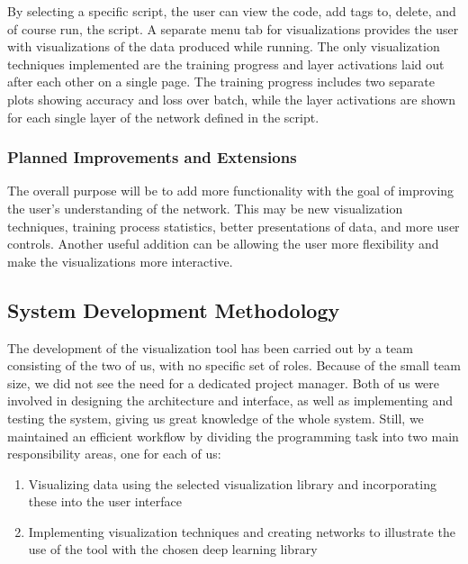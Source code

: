 \noindent By selecting a specific script, the user can view the code, add tags to, delete, and of course run, the script. A separate menu tab for visualizations provides the user with visualizations of the data produced while running. The only visualization techniques implemented are the training progress and layer activations laid out after each other on a single page. The training progress includes two separate plots showing accuracy and loss over batch, while the layer activations are shown for each single layer of the network defined in the script.

\subsubsection{Planned Improvements and Extensions}

The overall purpose will be to add more functionality with the goal of improving the user's understanding of the network. This may be new visualization techniques, training process statistics, better presentations of data, and more user controls. Another useful addition can be allowing the user more flexibility and make the visualizations more interactive.

\subsection{System Development Methodology}

The development of the visualization tool has been carried out by a team consisting of the two of us, with no specific set of roles. Because of the small team size, we did not see the need for a dedicated project manager. Both of us were involved in designing the architecture and interface, as well as implementing and testing the system, giving us great knowledge of the whole system. Still, we maintained an efficient workflow by dividing the programming task into two main responsibility areas, one for each of us:
\begin{enumerate}
    \item Visualizing data using the selected visualization library and incorporating these into the user interface
    \item Implementing visualization techniques and creating networks to illustrate the use of the tool with the chosen deep learning library
\end{enumerate} %

